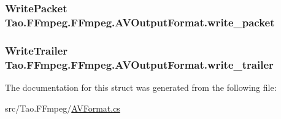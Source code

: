 \label{struct_tao_1_1_f_fmpeg_1_1_f_fmpeg_1_1_a_v_output_format_a34713f8d6547dd169040adaf767094b0}
\hypertarget{struct_tao_1_1_f_fmpeg_1_1_f_fmpeg_1_1_a_v_output_format_a21e22012b834a6e67a733c1a67b170c4}{
\subsubsection[{write\_\-packet}]{\setlength{\rightskip}{0pt plus 5cm}WritePacket {\bf Tao.FFmpeg.FFmpeg.AVOutputFormat.write\_\-packet}}}
\label{struct_tao_1_1_f_fmpeg_1_1_f_fmpeg_1_1_a_v_output_format_a21e22012b834a6e67a733c1a67b170c4}
\hypertarget{struct_tao_1_1_f_fmpeg_1_1_f_fmpeg_1_1_a_v_output_format_abfbda8b11007192e7ccb2dbee309c096}{
\subsubsection[{write\_\-trailer}]{\setlength{\rightskip}{0pt plus 5cm}WriteTrailer {\bf Tao.FFmpeg.FFmpeg.AVOutputFormat.write\_\-trailer}}}
\label{struct_tao_1_1_f_fmpeg_1_1_f_fmpeg_1_1_a_v_output_format_abfbda8b11007192e7ccb2dbee309c096}


The documentation for this struct was generated from the following file:\begin{DoxyCompactItemize}
\item 
src/Tao.FFmpeg/\hyperlink{_a_v_format_8cs}{AVFormat.cs}\end{DoxyCompactItemize}
